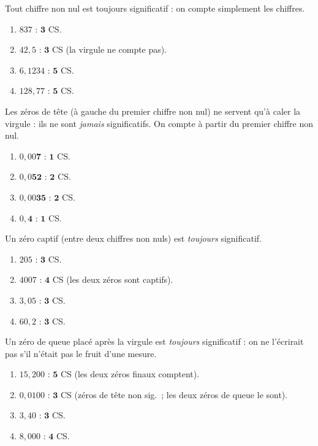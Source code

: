 \documentclass[11pt,a4paper]{article}
\begin{document}
\begin{corrige}
Tout chiffre non nul est toujours significatif : on compte simplement les chiffres.
\begin{enumerate}[label=\alph*)]
  \item $837$ : $\mathbf{3}$ CS.
  \item $42,5$ : $\mathbf{3}$ CS (la virgule ne compte pas).
  \item $6,1234$ : $\mathbf{5}$ CS.
  \item $128,77$ : $\mathbf{5}$ CS.
\end{enumerate}
\end{corrige}

\begin{corrige}
Les zéros de tête (à gauche du premier chiffre non nul) ne servent qu'à caler la virgule : ils ne
sont \emph{jamais} significatifs. On compte à partir du premier chiffre non nul.
\begin{enumerate}[label=\alph*)]
  \item $0,00\mathbf{7}$ : $\mathbf{1}$ CS.
  \item $0,0\mathbf{52}$ : $\mathbf{2}$ CS.
  \item $0,00\mathbf{35}$ : $\mathbf{2}$ CS.
  \item $0,\mathbf{4}$ : $\mathbf{1}$ CS.
\end{enumerate}
\end{corrige}

\begin{corrige}
Un zéro captif (entre deux chiffres non nuls) est \emph{toujours} significatif.
\begin{enumerate}[label=\alph*)]
  \item $205$ : $\mathbf{3}$ CS.
  \item $4007$ : $\mathbf{4}$ CS (les deux zéros sont captifs).
  \item $3,05$ : $\mathbf{3}$ CS.
  \item $60,2$ : $\mathbf{3}$ CS.
\end{enumerate}
\end{corrige}

\begin{corrige}
Un zéro de queue placé après la virgule est \emph{toujours} significatif : on ne l'écrirait pas s'il
n'était pas le fruit d'une mesure.
\begin{enumerate}[label=\alph*)]
  \item $15,200$ : $\mathbf{5}$ CS (les deux zéros finaux comptent).
  \item $0,0100$ : $\mathbf{3}$ CS (zéros de tête non sig.\ ; les deux zéros de queue le sont).
  \item $3,40$ : $\mathbf{3}$ CS.
  \item $8,000$ : $\mathbf{4}$ CS.
\end{enumerate}
\end{corrige}
\end{document}
